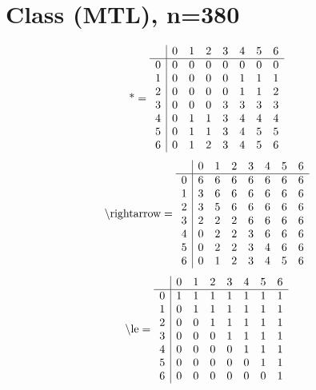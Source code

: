 \documentclass[11pt]{article}
\begin{document}
\section{Class (MTL), n=380}
\[\text{*} = 
\begin{array}{r | r r r r r r r}
 & 0 & 1 & 2 & 3 & 4 & 5 & 6 \\ \hline
0 & 0 & 0 & 0 & 0 & 0 & 0 & 0 \\
1 & 0 & 0 & 0 & 0 & 1 & 1 & 1 \\
2 & 0 & 0 & 0 & 0 & 1 & 1 & 2 \\
3 & 0 & 0 & 0 & 3 & 3 & 3 & 3 \\
4 & 0 & 1 & 1 & 3 & 4 & 4 & 4 \\
5 & 0 & 1 & 1 & 3 & 4 & 5 & 5 \\
6 & 0 & 1 & 2 & 3 & 4 & 5 & 6 \\
\end{array}
\]
\[\text{\textbackslash rightarrow} = 
\begin{array}{r | r r r r r r r}
 & 0 & 1 & 2 & 3 & 4 & 5 & 6 \\ \hline
0 & 6 & 6 & 6 & 6 & 6 & 6 & 6 \\
1 & 3 & 6 & 6 & 6 & 6 & 6 & 6 \\
2 & 3 & 5 & 6 & 6 & 6 & 6 & 6 \\
3 & 2 & 2 & 2 & 6 & 6 & 6 & 6 \\
4 & 0 & 2 & 2 & 3 & 6 & 6 & 6 \\
5 & 0 & 2 & 2 & 3 & 4 & 6 & 6 \\
6 & 0 & 1 & 2 & 3 & 4 & 5 & 6 \\
\end{array}
\]
\[\text{\textbackslash le} = 
\begin{array}{r | r r r r r r r}
 & 0 & 1 & 2 & 3 & 4 & 5 & 6 \\ \hline
0 & 1 & 1 & 1 & 1 & 1 & 1 & 1 \\
1 & 0 & 1 & 1 & 1 & 1 & 1 & 1 \\
2 & 0 & 0 & 1 & 1 & 1 & 1 & 1 \\
3 & 0 & 0 & 0 & 1 & 1 & 1 & 1 \\
4 & 0 & 0 & 0 & 0 & 1 & 1 & 1 \\
5 & 0 & 0 & 0 & 0 & 0 & 1 & 1 \\
6 & 0 & 0 & 0 & 0 & 0 & 0 & 1 \\
\end{array}
\]
\end{document}

